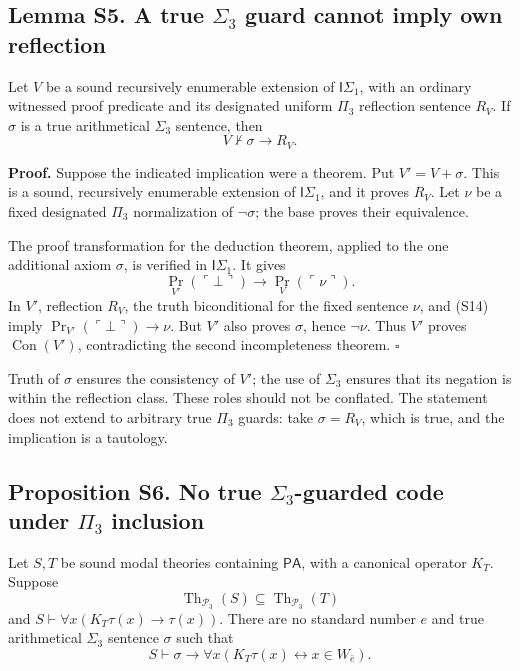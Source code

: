 \documentclass[
  11pt,
  letterpaper,
]{article}
\begin{document}
\subsection{\texorpdfstring{Lemma S5. A true \(\Sigma_3\) guard cannot
imply own
reflection}{Lemma S5. A true \textbackslash Sigma\_3 guard cannot imply own reflection}}\label{lemma-s5.-a-true-sigma_3-guard-cannot-imply-own-reflection}

Let \(V\) be a sound recursively enumerable extension of
\(\mathsf I\Sigma_1\), with an ordinary witnessed proof predicate and
its designated uniform \(\Pi_3\) reflection sentence \(R_V\). If
\(\sigma\) is a true arithmetical \(\Sigma_3\) sentence, then \[
V\nvdash\sigma\rightarrow R_V.
\tag{S13}
\]

\textbf{Proof.} Suppose the indicated implication were a theorem. Put
\(V'=V+\sigma\). This is a sound, recursively enumerable extension of
\(\mathsf I\Sigma_1\), and it proves \(R_V\). Let \(\nu\) be a fixed
designated \(\Pi_3\) normalization of \(\neg\sigma\); the base proves
their equivalence.

The proof transformation for the deduction theorem, applied to the one
additional axiom \(\sigma\), is verified in \(\mathsf I\Sigma_1\). It
gives \[
\operatorname{Pr}_{V'}(\ulcorner\bot\urcorner)
\rightarrow
\operatorname{Pr}_V(\ulcorner\nu\urcorner).
\tag{S14}
\] In \(V'\), reflection \(R_V\), the truth biconditional for the fixed
sentence \(\nu\), and (S14) imply
\(\operatorname{Pr}_{V'}(\ulcorner\bot\urcorner)\rightarrow\nu\). But
\(V'\) also proves \(\sigma\), hence \(\neg\nu\). Thus \(V'\) proves
\(\operatorname{Con}(V')\), contradicting the second incompleteness
theorem. \hfill\(\square\)

Truth of \(\sigma\) ensures the consistency of \(V'\); the use of
\(\Sigma_3\) ensures that its negation is within the reflection class.
These roles should not be conflated. The statement does not extend to
arbitrary true \(\Pi_3\) guards: take \(\sigma=R_V\), which is true, and
the implication is a tautology.

\subsection{\texorpdfstring{Proposition S6. No true \(\Sigma_3\)-guarded
code under \(\Pi_3\)
inclusion}{Proposition S6. No true \textbackslash Sigma\_3-guarded code under \textbackslash Pi\_3 inclusion}}\label{proposition-s6.-no-true-sigma_3-guarded-code-under-pi_3-inclusion}

Let \(S,T\) be sound modal theories containing \(\mathsf{PA}\), with a
canonical operator \(K_T\). Suppose \[
\operatorname{Th}_{\mathcal P_3}(S)
\subseteq\operatorname{Th}_{\mathcal P_3}(T)
\tag{S15}
\] and \(S\vdash\forall x(K_T\tau(x)\rightarrow\tau(x))\). There are no
standard number \(e\) and true arithmetical \(\Sigma_3\) sentence
\(\sigma\) such that \[
S\vdash\sigma\rightarrow
\forall x(K_T\tau(x)\leftrightarrow x\in W_{\bar e}).
\tag{S16}
\]
\end{document}
